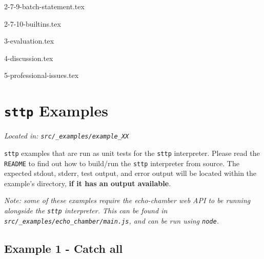\documentclass[]{full}
\theoremstyle{definition}
\begin{document}
{2-7-9-batch-statement.tex}

{2-7-10-builtins.tex}

{3-evaluation.tex}

{4-discussion.tex}

{5-professional-issues.tex}


\appendix




\cprotect\chapter{\verb|sttp| Examples}
\label{appendix:sttp-examples}

\cprotect\textit{Located in: \verb|src/_examples/example_XX|}

\verb|sttp| examples that are run as unit tests for the \verb|sttp| interpreter. Please read the \verb|README| to find out how to build/run the \verb|sttp| interpreter from source. The expected stdout, stderr, test output, and error output will be located within the example's directory, \textbf{if it has an output available}.

\cprotect\textit{Note: some of these examples require the echo-chamber web API to be running alongside the \verb|sttp| interpreter. This can be found in \verb|src/_examples/echo_chamber/main.js|, and can be run using \verb|node|.}

\section{Example 1 - Catch all}
\label{appendix:sttp-examples-1}
\inputminted[autogobble, breaklines, tabsize=4]{text}{../../src/_examples/example_01/example_01.sttp}
\end{document}
